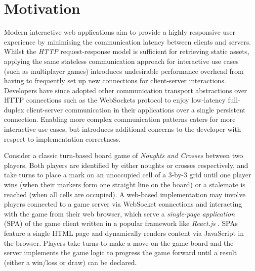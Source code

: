 \section{Motivation}


Modern interactive web applications aim to 
provide a highly responsive user experience by 
minimising the communication latency between clients and servers. 
Whilst the \textit{HTTP} request-response model is 
sufficient for retrieving static assets, applying the same 
stateless communication approach for interactive use cases 
(such as multiplayer games) introduces undesirable 
performance overhead from having to frequently set up 
new connections for client-server interactions. 
Developers have since adopted other communication 
transport abstractions over HTTP connections such as the WebSockets protocol \cite{WebSocketRFC} to enjoy low-latency full-duplex 
client-server communication in their applications over 
a single persistent connection. 
Enabling more complex communication patterns caters for 
more interactive use cases, but introduces additional 
concerns to the developer with respect to implementation correctness.

Consider a classic turn-based board game of \textit{Noughts and Crosses} 
between two players. Both players are identified by either noughts or crosses 
respectively, and take turns to place a mark on an unoccupied cell 
of a 3-by-3 grid until one player wins (when their markers form 
one straight line on the board) or a stalemate is reached 
(when all cells are occupied). A web-based implementation may 
involve players connected to a game server via WebSocket connections 
and interacting with the game from their web browser, which serve 
a \textit{single-page application} (SPA) of the game client written 
in a popular framework like \textit{React.js} \cite{React}. 
SPAs feature a single HTML page and dynamically renders content 
via JavaScript in the browser. 
Players take turns to make a move on the game board and the server 
implements the game logic to progress the game forward until 
a result (either a win/loss or draw) can be declared. 

